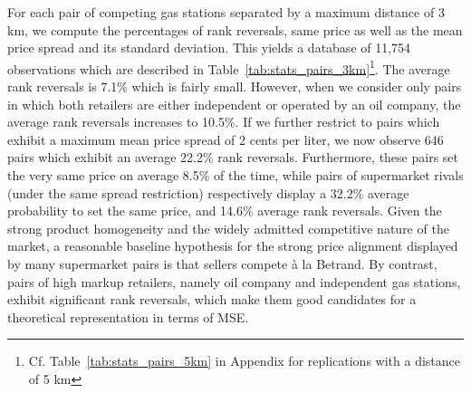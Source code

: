 \documentclass[english]{article}
\begin{document}
For each pair of competing gas stations separated by a maximum distance of 3 km, we compute the percentages of rank reversals, same price as well as the mean price spread and its standard deviation. This yields a database of 11,754 observations which are described in Table~\ref{tab:stats_pairs_3km}\footnote{Cf. Table~\ref{tab:stats_pairs_5km} in Appendix for replications with a distance of 5 km}. The average rank reversals is 7.1\% which is fairly small. However, when we consider only pairs in which both retailers are either independent or operated by an oil company, the average rank reversals increases to 10.5\%. If we further restrict to pairs which exhibit a maximum mean price spread of 2 cents per liter, we now observe 646 pairs which exhibit an average 22.2\% rank reversals. Furthermore, these pairs set the very same price on average 8.5\% of the time, while pairs of supermarket rivals (under the same spread restriction) respectively display a 32.2\% average probability to set the same price, and 14.6\% average rank reversals. Given the strong product homogeneity and the widely admitted competitive nature of the market, a reasonable baseline hypothesis for the strong price alignment displayed by many supermarket pairs is that sellers compete \`{a} la Betrand. By contrast, pairs of high markup retailers, namely oil company and independent gas stations, exhibit significant rank reversals, which make them good candidates for a theoretical representation in terms of MSE.
\end{document}
